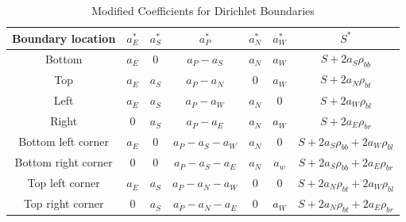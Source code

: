 \begin{table}[htbp]
    \caption{\label{tab:dirichletBoundaries} Modified Coefficients for Dirichlet Boundaries}
    \centering
    \begin{tabular}{c|c|c|c|c|c|c}
    \hline
    \textbf{Boundary location} & \textbf{$a_{E}^{*}$} & \textbf{$a_{S}^{*}$} & \textbf{$a_{P}^{*}$} & \textbf{$a_{N}^{*}$} & \textbf{$a_{W}^{*}$} & \textbf{$S^{*}$} \\ [0.5ex]
    \hline
    \hline
    Bottom & $a_{E}$ & $0$ & $a_{P} - a_{S}$ & $a_{N}$ & $a_{W}$ & $S + 2a_{S}\rho_{bb}$\\ \hline
    Top & $a_{E}$ & $a_{S}$ & $a_{P} - a_{N}$ & $0$ & $a_{W}$ & $S + 2a_{N}\rho_{bt}$ \\ \hline 
    Left & $a_{E}$ & $a_{S}$ & $a_{P} - a_{W}$ & $a_{N}$ & $0$ & $S + 2a_{W}\rho_{bl}$  \\ \hline
    Right & $0$ & $a_{S}$ & $a_{P} - a_{E}$ & $a_{N}$ & $a_{W}$ & $S + 2a_{E}\rho_{br}$  \\ \hline
    Bottom left corner & $a_{E}$ & $0$ & $a_{P} - a_{S} - a_{W}$ & $a_{N}$ & $0$ & $S + 2a_{S}\rho_{bb} + 2a_{W}\rho_{bl}$ \\ \hline
    Bottom right corner & $0$ & $0$ & $a_{P} - a_{S} - a_{E}$ & $a_{N}$ & $a_{w}$ & $S + 2a_{S}\rho_{bb} + 2a_{E}\rho_{br}$ \\ \hline
    Top left corner & $a_{E}$ & $a_{S}$ & $a_{P} - a_{N} - a_{W}$ & $0$ & $0$ & $S + 2a_{N}\rho_{bt} + 2a_{W}\rho_{bl}$ \\ \hline
    Top right corner & $0$ & $a_{S}$ & $a_{P} - a_{N} - a_{E}$ & $0$ & $a_{W}$ & $S + 2a_{N}\rho_{bt} + 2a_{E}\rho_{br}$ \\ \hline
    \end{tabular}
\end{table}

